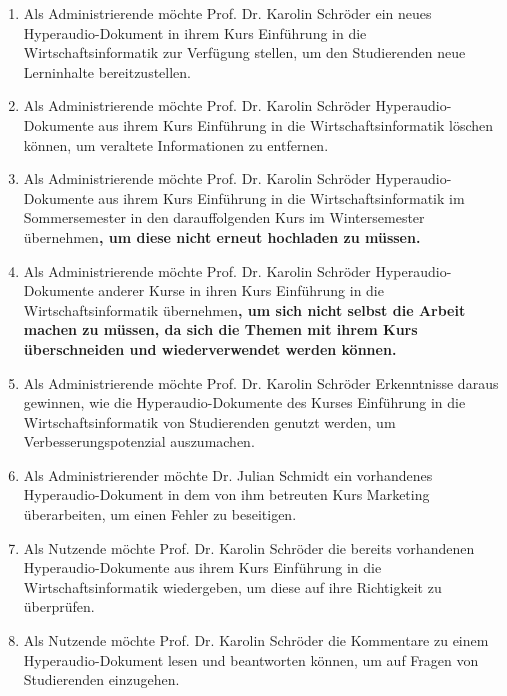 \begin{enumerate}

\item Als Administrierende möchte Prof. Dr. Karolin Schröder ein neues Hyperaudio-Dokument in ihrem Kurs \glqq Einführung in die Wirtschaftsinformatik\grqq{} zur Verfügung stellen, um den Studierenden neue Lerninhalte bereitzustellen.

\item Als Administrierende möchte Prof. Dr. Karolin Schröder Hyperaudio-Dokumente aus ihrem Kurs \glqq Einführung in die Wirtschaftsinformatik\grqq{} löschen können, um veraltete Informationen zu entfernen.

\item Als Administrierende möchte Prof. Dr. Karolin Schröder Hyperaudio-Dokumente aus ihrem Kurs \glqq Einführung in die Wirtschaftsinformatik\grqq{} im Sommersemester in den darauffolgenden Kurs im Wintersemester übernehmen\textbf{, um diese nicht erneut hochladen zu müssen.}

\item Als Administrierende möchte Prof. Dr. Karolin Schröder Hyperaudio-Dokumente anderer Kurse in ihren Kurs \glqq Einführung in die Wirtschaftsinformatik\grqq{} übernehmen\textbf{, um sich nicht selbst die Arbeit machen zu müssen, da sich die Themen mit ihrem Kurs überschneiden und wiederverwendet werden können.}

\item Als Administrierende möchte Prof. Dr. Karolin Schröder Erkenntnisse daraus gewinnen, wie die Hyperaudio-Dokumente des Kurses \glqq Einführung in die Wirtschaftsinformatik\grqq{} von Studierenden genutzt werden, um Verbesserungspotenzial auszumachen.

\item Als Administrierender möchte Dr. Julian Schmidt ein vorhandenes Hyperaudio-Dokument in dem von ihm betreuten Kurs \glqq Marketing\grqq{} überarbeiten, um einen Fehler zu beseitigen.

\item Als Nutzende möchte Prof. Dr. Karolin Schröder die bereits vorhandenen Hyperaudio-Dokumente aus ihrem Kurs \glqq Einführung in die Wirtschaftsinformatik\grqq{} wiedergeben, um diese auf ihre Richtigkeit zu überprüfen.

\item Als Nutzende möchte Prof. Dr. Karolin Schröder die Kommentare zu einem Hyperaudio-Dokument lesen und beantworten können, um auf Fragen von Studierenden einzugehen.


\end{enumerate}
